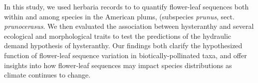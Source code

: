 \documentclass{article}[11pt]
\begin{document}
\noindent In this study, %
we used herbaria records to to quantify flower-leaf sequences both within and among species in the American plums, (subspecies  \textit{prunus}, sect. \textit{prunocerasus}. We then evaluated the association between hysteranthy and several ecological and morphological traits to test the predictions of the hydraulic demand hypothesis of hysteranthy. Our findings both clarify the hypothesized function of flower-leaf sequence variation in biotically-pollinated taxa, and offer insights into how flower-leaf sequences may impact species distributions as climate continues to change.







\end{document}
